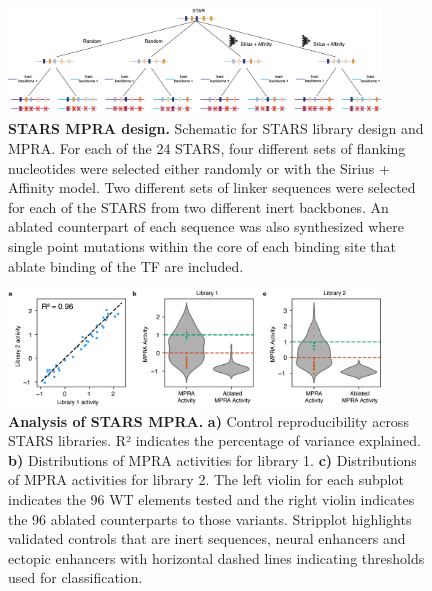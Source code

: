 \begin{figure}[p]
    \centering
    \includegraphics[width=0.88\textwidth]{2_figures-and-files/SuppFig12.png}
    \caption[STARS MPRA design.]{\textbf{STARS MPRA design.} Schematic for STARS library design and MPRA. For each of the 24 STARS, four different sets of flanking nucleotides were selected either randomly or with the Sirius + Affinity model. Two different sets of linker sequences were selected for each of the STARS from two different inert backbones. An ablated counterpart of each sequence was also synthesized where single point mutations within the core of each binding site that ablate binding of the TF are included.}
    \label{fig:2 supplementary_12}
\end{figure}

\begin{figure}[p]
    \centering
    \includegraphics[width=0.88\textwidth]{2_figures-and-files/SuppFig13.png}
    \caption[Analysis of STARS MPRA.]{\textbf{Analysis of STARS MPRA.} \textbf{a)} Control reproducibility across STARS libraries. R² indicates the percentage of variance explained. \textbf{b)} Distributions of MPRA activities for library 1. \textbf{c)} Distributions of MPRA activities for library 2. The left violin for each subplot indicates the 96 WT elements tested and the right violin indicates the 96 ablated counterparts to those variants. Stripplot highlights validated controls that are inert sequences, neural enhancers and ectopic enhancers with horizontal dashed lines indicating thresholds used for classification.}
    \label{fig:2 supplementary_13}
\end{figure}

